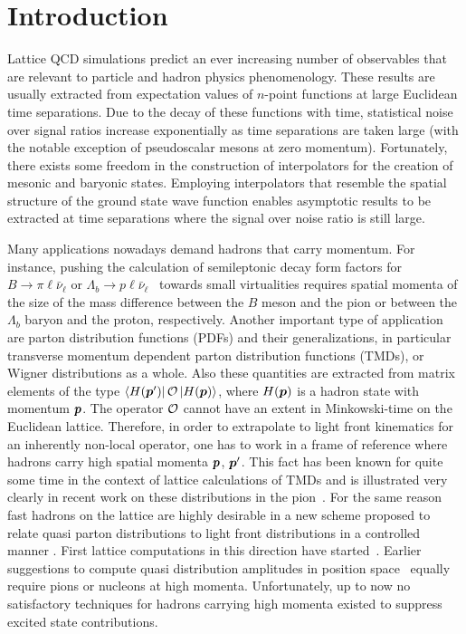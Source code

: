 \section{Introduction}
Lattice QCD simulations predict an ever increasing number of observables
that are relevant to particle and hadron physics phenomenology.
These results are usually extracted from expectation values
of $n$-point functions at large Euclidean time separations.
Due to the decay of these functions with time, statistical noise
over signal ratios increase exponentially as time separations
are taken large (with the notable exception of pseudoscalar
mesons at zero momentum).
Fortunately, there exists some freedom in the construction of interpolators
for the creation of mesonic and baryonic states. Employing interpolators
that resemble the spatial structure of
the ground state wave function enables asymptotic results to be extracted at
time separations where the signal over noise ratio is still large.

Many applications nowadays demand hadrons that carry momentum.
For instance, pushing the calculation of semileptonic decay form
factors for $B\rightarrow\pi\ell\bar{\nu}_{\ell}$ or
$\Lambda_b\rightarrow p\ell\bar{\nu}_{\ell}$~\cite{Detmold:2015aaa}
towards small virtualities requires spatial momenta of the
size of the mass difference between the $B$ meson and
the pion or between the $\Lambda_b$ baryon and the proton, respectively.
Another important type of application are parton distribution functions (PDFs) and their generalizations, in particular transverse momentum dependent parton distribution functions (TMDs), or Wigner distributions as a whole. 
Also these quantities are extracted from matrix elements of the type $ \left\langle H(\boldsymbol{p}') \right| \mathcal{O} \left| H(\boldsymbol{p}) \right\rangle$, where $H(\boldsymbol{p})$
is a hadron state with momentum $\boldsymbol{p}$.
The operator $\mathcal{O}$ cannot have an extent in Minkowski-time on the Euclidean
lattice. Therefore, in order to extrapolate to light front kinematics for an inherently non-local operator,
one has to work in a frame of reference where hadrons carry high spatial momenta $\boldsymbol{p}$, $\boldsymbol{p}'$.
This fact has been known for quite some time in the context of lattice calculations of TMDs \cite{Hagler:2009mb,Musch:2010ka,Musch:2011er} 
and is illustrated very clearly in recent work on these distributions in the pion~\cite{Engelhardt:2015xja}.
For the same reason fast hadrons on the lattice are highly desirable in a new scheme proposed 
to relate quasi parton distributions to light front
distributions in a controlled manner \cite{Ji:2013dva,Ji:2015jwa}.
First lattice
computations in this direction have
started~\cite{Lin:2014zya,Alexandrou:2015rja}.
Earlier suggestions to compute quasi distribution amplitudes
in position space~\cite{Aglietti:1998ur,Abada:2001if,Braun:2007wv}
equally require
pions or nucleons at high momenta. Unfortunately,
up to now no satisfactory techniques for hadrons carrying high momenta
existed to suppress excited
state contributions.

